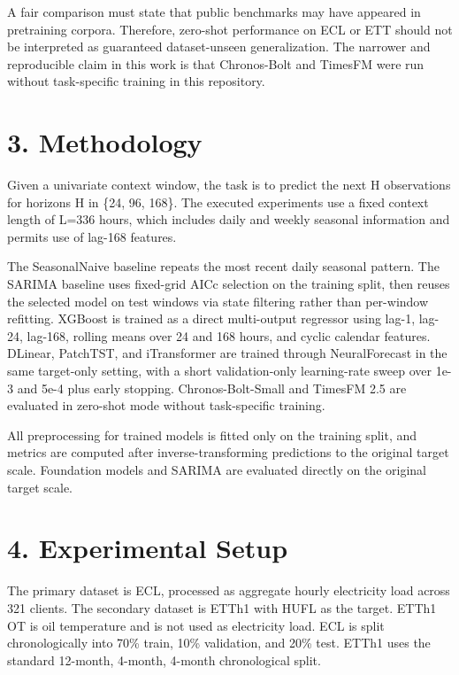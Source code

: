 A fair comparison must state that public benchmarks may have appeared in
pretraining corpora. Therefore, zero-shot performance on ECL or ETT
should not be interpreted as guaranteed dataset-unseen generalization.
The narrower and reproducible claim in this work is that Chronos-Bolt
and TimesFM were run without task-specific training in this repository.

\section{3. Methodology}\label{methodology}

Given a univariate context window, the task is to predict the next H
observations for horizons H in \{24, 96, 168\}. The executed experiments
use a fixed context length of L=336 hours, which includes daily and
weekly seasonal information and permits use of lag-168 features.

The SeasonalNaive baseline repeats the most recent daily seasonal
pattern. The SARIMA baseline uses fixed-grid AICc selection on the
training split, then reuses the selected model on test windows via state
filtering rather than per-window refitting. XGBoost is trained as a
direct multi-output regressor using lag-1, lag-24, lag-168, rolling
means over 24 and 168 hours, and cyclic calendar features. DLinear,
PatchTST, and iTransformer are trained through NeuralForecast in the
same target-only setting, with a short validation-only learning-rate
sweep over 1e-3 and 5e-4 plus early stopping. Chronos-Bolt-Small and
TimesFM 2.5 are evaluated in zero-shot mode without task-specific
training.

All preprocessing for trained models is fitted only on the training
split, and metrics are computed after inverse-transforming predictions
to the original target scale. Foundation models and SARIMA are evaluated
directly on the original target scale.

\section{4. Experimental Setup}\label{experimental-setup}

The primary dataset is ECL, processed as aggregate hourly electricity
load across 321 clients. The secondary dataset is ETTh1 with HUFL as the
target. ETTh1 OT is oil temperature and is not used as electricity load.
ECL is split chronologically into 70\% train, 10\% validation, and 20\%
test. ETTh1 uses the standard 12-month, 4-month, 4-month chronological
split.

